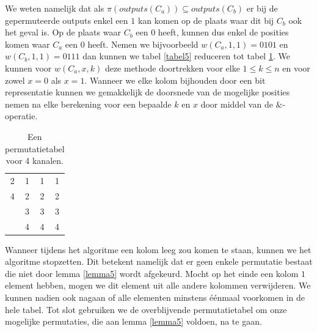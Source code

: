 \documentclass{article}
\begin{document}
We weten namelijk dat als ${\pi\left(outputs\left(C_a\right)\right) \subseteq outputs\left(C_b\right)}$ er bij de gepermuteerde outputs enkel een $1$ kan komen op de plaats waar dit bij $C_b$ ook het geval is.
Op de plaats waar $C_b$ een $0$ heeft, kunnen dus enkel de posities komen waar $C_a$ een $0$ heeft.
Nemen we bijvoorbeeld $w\left(C_a,1,1\right) = 0101$ en ${w\left(C_b,1,1\right)=0111}$ dan kunnen we tabel \ref{tabel5} reduceren tot tabel \ref{tabel6}.
We kunnen voor $w\left(C_a, x, k\right)$ deze methode doortrekken voor elke $1 \leq k \leq n$ en voor zowel $x = 0$ als $x = 1$.
Wanneer we elke kolom bijhouden door een bit representatie kunnen we gemakkelijk de doorsnede van de mogelijke posities nemen na elke berekening voor een bepaalde $k$ en $x$ door middel van de $\&$-operatie. 
\begin{table}[!h]
\centering
\begin{tabular}{|c|c|c|c|}
\hline
2 & 1 & 1 & 1 \\ 
4 & 2 & 2 & 2\\ 
 & 3 & 3 & 3 \\
 & 4 & 4 & 4\\ 
\hline 
\end{tabular}
\caption{Een permutatietabel voor 4 kanalen.}
\label{tabel6}
\end{table}

Wanneer tijdens het algoritme een kolom leeg zou komen te staan, kunnen we het algoritme stopzetten.
Dit betekent namelijk dat er geen enkele permutatie bestaat die niet door lemma \ref{lemma5} wordt afgekeurd.
Mocht op het einde een kolom $1$ element hebben, mogen we dit element uit alle andere kolommen verwijderen.
We kunnen nadien ook nagaan of alle elementen minstens \'e\'enmaal voorkomen in de hele tabel.
Tot slot gebruiken we de overblijvende permutatietabel om onze mogelijke permutaties, die aan lemma \ref{lemma5} voldoen, na te gaan. 
\end{document}
